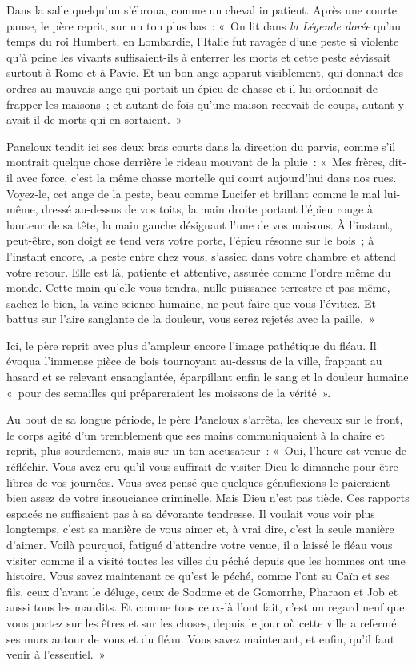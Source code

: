 \documentclass[french,twoside]{book} %
\begin{document}
Dans la salle quelqu’un s’ébroua, comme un cheval impatient. Après une courte pause, le père reprit, sur un ton plus bas : « On lit dans \emph{la Légende dorée} qu’au temps du roi Humbert, en Lombardie, l’Italie fut ravagée d’une peste si violente qu’à peine les vivants suffisaient-ils à enterrer les morts et cette peste sévissait surtout à Rome et à Pavie. Et un bon ange apparut visiblement, qui donnait des ordres au mauvais ange qui portait un épieu de chasse et il lui ordonnait de frapper les maisons ; et autant de fois qu’une maison recevait de coups, autant y avait-il de morts qui en sortaient. »\par
Paneloux tendit ici ses deux bras courts dans la direction du parvis, comme s’il montrait quelque chose derrière le rideau mouvant de la pluie : « Mes frères, dit-il avec force, c’est la même chasse mortelle qui court aujourd’hui dans nos rues. Voyez-le, cet ange de la peste, beau comme Lucifer et brillant comme le mal lui-même, dressé au-dessus de vos toits, la main droite portant l’épieu rouge à hauteur de sa tête, la main gauche désignant l’une de vos maisons. À l’instant, peut-être, son doigt se tend vers votre porte, l’épieu résonne sur le bois ; à l’instant encore, la peste entre chez vous, s’assied dans votre chambre et attend votre retour. Elle est là, patiente et attentive, assurée comme l’ordre même du monde. Cette main qu’elle vous tendra, nulle puissance terrestre et pas même, sachez-le bien, la vaine science humaine, ne peut faire que vous l’évitiez. Et battus sur l’aire sanglante de la douleur, vous serez rejetés avec la paille. »\par
Ici, le père reprit avec plus d’ampleur encore l’image pathétique du fléau. Il évoqua l’immense pièce de bois tournoyant au-dessus de la ville, frappant au hasard et se relevant ensanglantée, éparpillant enfin le sang et la douleur humaine « pour des semailles qui prépareraient les moissons de la vérité ».\par
Au bout de sa longue période, le père Paneloux s’arrêta, les cheveux sur le front, le corps agité d’un tremblement que ses mains communiquaient à la chaire et reprit, plus sourdement, mais sur un ton accusateur : « Oui, l’heure est venue de réfléchir. Vous avez cru qu’il vous suffirait de visiter Dieu le dimanche pour être libres de vos journées. Vous avez pensé que quelques génuflexions le paieraient bien assez de votre insouciance criminelle. Mais Dieu n’est pas tiède. Ces rapports espacés ne suffisaient pas à sa dévorante tendresse. Il voulait vous voir plus longtemps, c’est sa manière de vous aimer et, à vrai dire, c’est la seule manière d’aimer. Voilà pourquoi, fatigué d’attendre votre venue, il a laissé le fléau vous visiter comme il a visité toutes les villes du péché depuis que les hommes ont une histoire. Vous savez maintenant ce qu’est le péché, comme l’ont su Caïn et ses fils, ceux d’avant le déluge, ceux de Sodome et de Gomorrhe, Pharaon et Job et aussi tous les maudits. Et comme tous ceux-là l’ont fait, c’est un regard neuf que vous portez sur les êtres et sur les choses, depuis le jour où cette ville a refermé ses murs autour de vous et du fléau. Vous savez maintenant, et enfin, qu’il faut venir à l’essentiel. »\par
\end{document}
